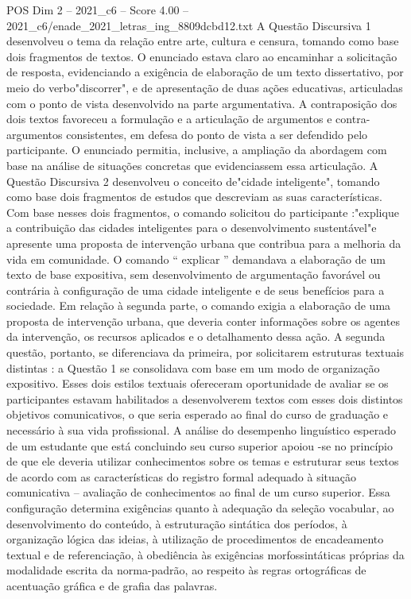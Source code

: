 \begin{textsample}{POS Dim 2 – 2021\_c6 – Score 4.00 – 2021\_c6/enade\_2021\_letras\_ing\_8809dcbd12.txt}
A Questão Discursiva 1 desenvolveu o tema da relação entre arte, cultura e censura, tomando como base dois fragmentos de textos.
O enunciado estava claro ao encaminhar a solicitação de resposta, evidenciando a exigência de elaboração de um texto dissertativo, por meio do verbo"discorrer", e de apresentação de duas ações educativas, articuladas com o ponto de vista desenvolvido na parte argumentativa.
A contraposição dos dois textos favoreceu a formulação e a articulação de argumentos e contra-argumentos consistentes, em defesa do ponto de vista a ser defendido pelo participante.
O enunciado permitia, inclusive, a ampliação da abordagem com base na análise de situações concretas que evidenciassem essa articulação.
A Questão Discursiva 2 desenvolveu o conceito de"cidade inteligente", tomando como base dois fragmentos de estudos que descreviam as suas características.
Com base nesses dois fragmentos, o comando solicitou do participante :"explique a contribuição das cidades inteligentes para o desenvolvimento sustentável"e apresente uma proposta de intervenção urbana que contribua para a melhoria da vida em comunidade.
O comando “ explicar ” demandava a elaboração de um texto de base expositiva, sem desenvolvimento de argumentação favorável ou contrária à configuração de uma cidade inteligente e de seus benefícios para a sociedade.
Em relação à segunda parte, o comando exigia a elaboração de uma proposta de intervenção urbana, que deveria conter informações sobre os agentes da intervenção, os recursos aplicados e o detalhamento dessa ação.
A segunda questão, portanto, se diferenciava da primeira, por solicitarem estruturas textuais distintas : a Questão 1 se consolidava com base em um modo de organização expositivo.
Esses dois estilos textuais ofereceram oportunidade de avaliar se os participantes estavam habilitados a desenvolverem textos com esses dois distintos objetivos comunicativos, o que seria esperado ao final do curso de graduação e necessário à sua vida profissional.
A análise do desempenho linguístico esperado de um estudante que está concluindo seu curso superior apoiou -se no princípio de que ele deveria utilizar conhecimentos sobre os temas e estruturar seus textos de acordo com as características do registro formal adequado à situação comunicativa – avaliação de conhecimentos ao final de um curso superior.
Essa configuração determina exigências quanto à adequação da seleção vocabular, ao desenvolvimento do conteúdo, à estruturação sintática dos períodos, à organização lógica das ideias, à utilização de procedimentos de encadeamento textual e de referenciação, à obediência às exigências morfossintáticas próprias da modalidade escrita da norma-padrão, ao respeito às regras ortográficas de acentuação gráfica e de grafia das palavras.

\end{textsample}
